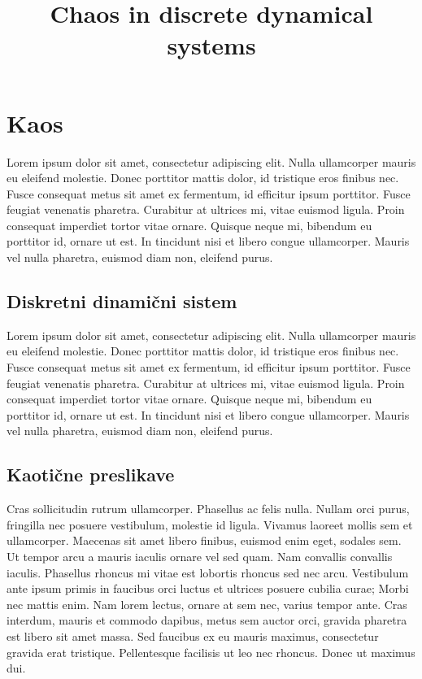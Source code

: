 \documentclass{isrmdelo}
\title{Chaos in discrete dynamical systems}
\begin{document}
\chapter{Kaos}

Lorem ipsum dolor sit amet, consectetur adipiscing elit. Nulla ullamcorper mauris eu eleifend molestie. Donec porttitor mattis dolor, id tristique eros finibus nec. Fusce consequat metus sit amet ex fermentum, id efficitur ipsum porttitor. Fusce feugiat venenatis pharetra. Curabitur at ultrices mi, vitae euismod ligula. Proin consequat imperdiet tortor vitae ornare. Quisque neque mi, bibendum eu porttitor id, ornare ut est. In tincidunt nisi et libero congue ullamcorper. Mauris vel nulla pharetra, euismod diam non, eleifend purus.

\section{Diskretni dinamični sistem}

Lorem ipsum dolor sit amet, consectetur adipiscing elit. Nulla ullamcorper mauris eu eleifend molestie. Donec porttitor mattis dolor, id tristique eros finibus nec. Fusce consequat metus sit amet ex fermentum, id efficitur ipsum porttitor. Fusce feugiat venenatis pharetra. Curabitur at ultrices mi, vitae euismod ligula. Proin consequat imperdiet tortor vitae ornare. Quisque neque mi, bibendum eu porttitor id, ornare ut est. In tincidunt nisi et libero congue ullamcorper. Mauris vel nulla pharetra, euismod diam non, eleifend purus.

\section{Kaotične preslikave}

Cras sollicitudin rutrum ullamcorper. Phasellus ac felis nulla. Nullam orci purus, fringilla nec posuere vestibulum, molestie id ligula. Vivamus laoreet mollis sem et ullamcorper. Maecenas sit amet libero finibus, euismod enim eget, sodales sem. Ut tempor arcu a mauris iaculis ornare vel sed quam. Nam convallis convallis iaculis. Phasellus rhoncus mi vitae est lobortis rhoncus sed nec arcu. Vestibulum ante ipsum primis in faucibus orci luctus et ultrices posuere cubilia curae; Morbi nec mattis enim. Nam lorem lectus, ornare at sem nec, varius tempor ante. Cras interdum, mauris et commodo dapibus, metus sem auctor orci, gravida pharetra est libero sit amet massa. Sed faucibus ex eu mauris maximus, consectetur gravida erat tristique. Pellentesque facilisis ut leo nec rhoncus. Donec ut maximus dui.
\end{document}
